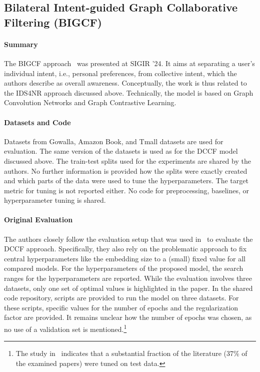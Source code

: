 \documentclass[sigconf,natbib=true,nonacm]{acmart}
\begin{document}
\subsection{Bilateral Intent-guided Graph Collaborative Filtering (BIGCF)}
\label{sec:BIGCF}
\paragraph{Summary} The BIGCF approach~\cite{zhang2024exploring} was presented at SIGIR '24. It aims at separating a user's individual intent, i.e., personal preferences, from collective intent, which the authors describe as overall awareness. Conceptually, the work is thus related to the IDS4NR approach discussed above. Technically, the model is based on Graph Convolution Networks and Graph Contrastive Learning.

\paragraph{Datasets and Code} Datasets from Gowalla, Amazon Book, and Tmall datasets are used for evaluation. The same version of the datasets is used as for the DCCF model discussed above. The train-test splits used for the experiments are shared by the authors. No further information is provided how the splits were exactly created and which parts of the data were used to tune the hyperparameters. The target metric for tuning is not reported either. No code for preprocessing, baselines, or hyperparameter tuning is shared.

\paragraph{Original Evaluation} The authors closely follow the evaluation setup that was used in~\cite{ren2023disentangled} to evaluate the DCCF approach. Specifically, they also rely on the problematic approach to fix central hyperparameters like the embedding size to a (small) fixed value for all compared models. For the hyperparameters of the proposed model, the search ranges for the hyperparameters are reported. While the evaluation involves three datasets, only one set of optimal values is highlighted in the paper. In the shared code repository, scripts are provided to run the model on three datasets. For these scripts, specific values for the number of epochs and the regularization factor are provided. It remains unclear how the number of epochs was chosen, as no use of a validation set is mentioned.\footnote{The study in~\cite{Sun2020Arewe} indicates that a substantial fraction of the literature (37\% of the examined papers) were tuned on test data.}
\end{document}
